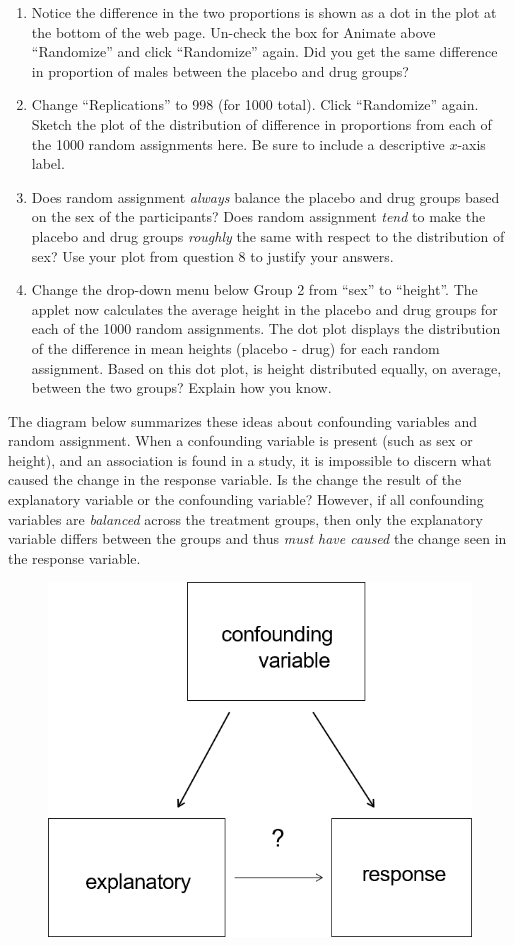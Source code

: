 \documentclass[
]{report}
\begin{document}
\begin{enumerate}
\def\labelenumi{\arabic{enumi}.}
\setcounter{enumi}{6}
\item
  Notice the difference in the two proportions is shown as a dot in the plot at the bottom of the web page. Un-check the box for Animate above ``Randomize'' and click ``Randomize'' again. Did you get the same difference in proportion of males between the placebo and drug groups?
  \vspace{0.25in}
\item
  Change ``Replications'' to 998 (for 1000 total). Click ``Randomize'' again. Sketch the plot of the distribution of difference in proportions from each of the 1000 random assignments here. Be sure to include a descriptive \(x\)-axis label.
  \vspace{1.25in}
\item
  Does random assignment \emph{always} balance the placebo and drug groups based on the sex of the participants? Does random assignment \emph{tend} to make the placebo and drug groups \emph{roughly} the same with respect to the distribution of sex? Use your plot from question 8 to justify your answers.
  \vspace{0.5in}
\item
  Change the drop-down menu below Group 2 from ``sex'' to ``height''. The applet now calculates the average height in the placebo and drug groups for each of the 1000 random assignments. The dot plot displays the distribution of the difference in mean heights (placebo - drug) for each random assignment. Based on this dot plot, is height distributed equally, on average, between the two groups? Explain how you know.
  \vspace{0.5in}
\end{enumerate}

\newpage

The diagram below summarizes these ideas about confounding variables and random assignment. When a confounding variable is present (such as sex or height), and an association is found in a study, it is impossible to discern what caused the change in the response variable. Is the change the result of the explanatory variable or the confounding variable? However, if all confounding variables are \emph{balanced} across the treatment groups, then only the explanatory variable differs between the groups and thus \emph{must have caused} the change seen in the response variable.

\begin{figure}

{\centering \includegraphics[width=0.4\linewidth]{images/confounding} 

}

\end{figure}
\end{document}
